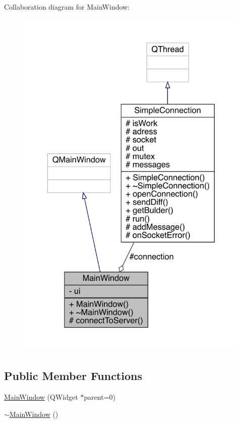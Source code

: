 Collaboration diagram for Main\+Window\+:
\nopagebreak
\begin{figure}[H]
\begin{center}
\leavevmode
\includegraphics[width=350pt]{de/d45/a00175}
\end{center}
\end{figure}
\subsection*{Public Member Functions}
\begin{DoxyCompactItemize}
\item 
\hyperlink{a00177_a8b244be8b7b7db1b08de2a2acb9409db}{Main\+Window} (Q\+Widget $\ast$parent=0)
\item 
\hyperlink{a00177_ae98d00a93bc118200eeef9f9bba1dba7}{$\sim$\+Main\+Window} ()
\end{DoxyCompactItemize}
